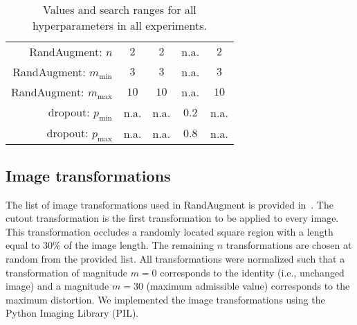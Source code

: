 \begin{table}
\begin{tabular}{r|cccc}
		RandAugment: $n$                    & $2$                   & $2$                   & n.a. & $2$                   \\ \hdashline[0.5pt/5pt]
		RandAugment: $m_{\text{min}}$       & $3$                   & $3$                   & n.a. &  $3$                 \\ \hdashline[0.5pt/5pt]
		RandAugment: $m_{\text{max}}$       & $10$                  & $10$                  & n.a.  &  $10$                \\ \hdashline[0.5pt/5pt]
		dropout: $p_{\text{min}}$           & n.a.                  & n.a.                  & $0.2$  & n.a.                 \\ \hdashline[0.5pt/5pt]
		dropout: $p_{\text{max}}$           & n.a.                  & n.a.                  & $0.8$  & n.a.                
	\end{tabular}
	\caption{Values and search ranges for all hyperparameters in all experiments.}
	\label{tab:hyperparameters}
\end{table}


\subsection{Image transformations}
\label{sec:img_transf}
The list of image transformations used in RandAugment is provided in~. The cutout transformation is the first transformation to be applied to every image. This transformation occludes a randomly located square region with a length equal to $30\%$ of the image length. The remaining $n$ transformations are chosen at random from the provided list. All transformations were normalized such that a transformation of magnitude $m = 0$ corresponds to the identity (i.e., unchanged image) and a magnitude $m = 30$ (maximum admissible value) corresponds to the maximum distortion. We implemented the image transformations using the Python Imaging Library (PIL).

